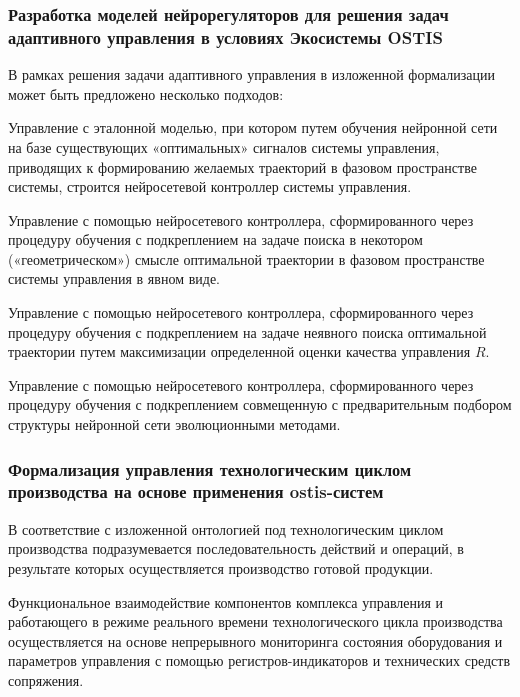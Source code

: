 \subsubsection{Разработка моделей нейрорегуляторов для решения задач адаптивного управления в условиях Экосистемы OSTIS}

В рамках решения задачи адаптивного управления в изложенной формализации может быть предложено несколько подходов:

\begin{textitemize}
    \item Управление с эталонной моделью, при котором путем обучения нейронной сети на базе существующих «оптимальных» сигналов системы управления, приводящих к формированию желаемых траекторий в фазовом пространстве системы, строится нейросетевой контроллер системы управления.
    \item Управление с помощью нейросетевого контроллера, сформированного через процедуру обучения с подкреплением на задаче поиска в некотором («геометрическом») смысле оптимальной траектории в фазовом пространстве системы управления в явном виде.
    \item Управление с помощью нейросетевого контроллера, сформированного через процедуру обучения с подкреплением на задаче неявного поиска оптимальной траектории путем максимизации определенной оценки качества управления $R$.
    \item Управление с помощью нейросетевого контроллера, сформированного через процедуру обучения с подкреплением совмещенную с предварительным подбором структуры нейронной сети эволюционными методами.

\end{textitemize}



\subsubsection{Формализация управления технологическим циклом производства на основе применения ostis-систем}

В соответствие с изложенной онтологией под технологическим циклом производства подразумевается последовательность действий и операций, в результате которых осуществляется производство готовой продукции.

Функциональное взаимодействие компонентов комплекса управления и работающего в режиме реального времени технологического цикла производства осуществляется на основе непрерывного мониторинга состояния оборудования и параметров управления с помощью регистров-индикаторов и технических средств сопряжения.



